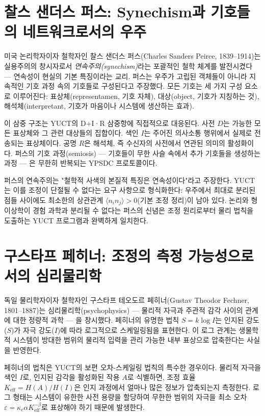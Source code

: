\documentclass[12pt,a4paper]{article}
\begin{document}
	\section{찰스 샌더스 퍼스: Synechism과 기호들의 네트워크로서의 우주}
	
	미국 논리학자이자 철학자인 찰스 샌더스 퍼스(Charles Sanders Peirce, 1839–1914)는 실용주의의 창시자로서 \emph{연속주의(synechism)}라는 포괄적인 철학 체계를 발전시켰다 — 연속성이 현실의 기본 특징이라는 교리. 퍼스는 우주가 고립된 객체들이 아니라 지속적인 기호 과정 속의 기호들로 구성된다고 주장했다. 모든 기호는 세 가지 구성 요소로 이루어진다: 표상체(representamen, 기호 자체), 대상(object, 기호가 지칭하는 것), 해석체(interpretant, 기호가 마음이나 시스템에 생산하는 효과).
	
	이 삼중 구조는 YUCT의 D+I·R 삼중항에 직접적으로 대응된다. 사전 \(D\)는 가능한 모든 표상체와 그 관련 대상들의 집합이다. 색인 \(I\)는 주어진 의사소통 행위에서 실제로 전송되는 표상체이다. 공명 \(R\)은 해석체, 즉 수신자의 사전에서 연관된 의미의 활성화이다. 퍼스의 기호 과정(semiosis) — 기호들이 무한 사슬 속에서 추가 기호들을 생성하는 과정 — 은 무한히 반복되는 YPSDC 프로토콜이다.
	
	퍼스의 연속주의는 "철학적 사색의 본질적 특징은 연속성이다"라고 주장한다. YUCT는 이를 조정이 단절될 수 없다는 요구 사항으로 형식화한다: 우주에서 최대로 분리된 점들 사이에도 최소한의 상관관계 \(\langle n_i n_j \rangle > 0\)(기본 조정 정리)이 남아 있다. 논리와 형이상학이 경험 과학과 분리될 수 없다는 퍼스의 신념은 조정 원리로부터 물리 법칙을 도출하는 YUCT 프로그램과 완벽하게 일치한다.
	
	\section{구스타프 페히너: 조정의 측정 가능성으로서의 심리물리학}
	
	독일 물리학자이자 철학자인 구스타프 테오도르 페히너(Gustav Theodor Fechner, 1801–1887)는 심리물리학(psychophysics) — 물리적 자극과 주관적 감각 사이의 관계에 대한 정량적 과학 — 을 창시했다. 페히너의 유명한 법칙 \(S = k \log I\)는 인지된 강도(\(S\))가 자극 강도(\(I\))에 따라 로그적으로 스케일링됨을 표현한다. 이 로그 관계는 생물학적 시스템이 방대한 범위의 물리적 입력을 관리 가능한 내부 표상으로 압축한다는 사실을 반영한다.
	
	페히너의 법칙은 YUCT의 보편 오차-스케일링 법칙의 특수한 경우이다. 물리적 자극을 색인 \(I\)로, 인지된 감각을 활성화된 작용 \(A\)로 식별하면, 조정 효율 \(K_{\mathrm{eff}} = H(A)/H(I)\)은 인지 과정에서 얼마나 많은 정보가 압축되는지 측정한다. 로그 형태는 시스템이 유한한 사전 용량을 할당하여 무한한 범위의 자극을 최소 오차 \(\varepsilon = \kappa_c \alpha K_{\mathrm{eff}}^{-\beta}\)로 표상해야 하기 때문에 발생한다.
	
\end{document}
